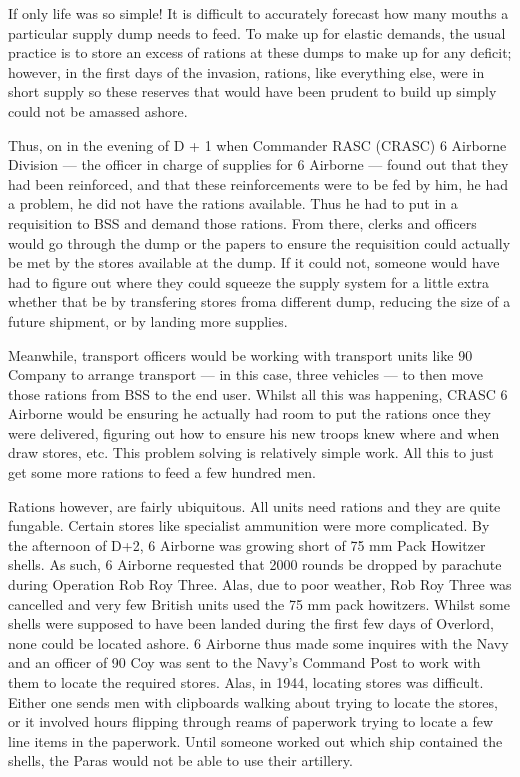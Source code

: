 \documentclass[noraggedright]{turabian-researchpaper}
\begin{document}
If only life was so simple!  It is difficult to accurately forecast how many
mouths a particular supply dump needs to feed. To make up for elastic demands,
the usual practice is to store an excess of 
rations at these dumps to make up for any deficit; however, in the first 
days of the invasion, rations, like everything else, were in short supply so 
these reserves that would have been prudent to build up simply could not be 
amassed ashore.  

Thus, on in the evening of D + 1 when Commander RASC (CRASC) 6 
Airborne Division --- the officer in charge of supplies for 6 Airborne --- 
found out that they had been reinforced, and that these reinforcements 
were to be fed by him, he had a problem, he did not have the rations 
available.\autocite[6]{90wdjun}  Thus he had to put in a requisition to
BSS and demand those rations.  From there, clerks and officers would go
through the dump or the papers to ensure the requisition could actually be 
met by the stores available at the dump.  If it could not, someone would have 
had to figure out where they could squeeze the supply system for a little 
extra whether that be by transfering stores froma  different dump, reducing
the size of a future shipment, or by landing more supplies.

Meanwhile, transport officers would be working with transport units like 90 
Company to arrange transport --- in this case, three vehicles --- to then 
move those rations from BSS to the end user.  Whilst all this was happening, 
CRASC 6 Airborne would be ensuring he actually had room to put the rations 
once they were delivered, figuring out how to ensure his new troops knew 
where and when draw stores, etc.  This problem solving is relatively simple 
work. All this to just get some more rations to feed a few hundred men.

Rations however, are fairly ubiquitous. All units need rations and they are
quite fungable.   Certain stores like specialist ammunition were more 
complicated.  By the afternoon of D+2, 6 Airborne was growing 
short of 75 mm Pack Howitzer shells.\autocite[7]{90wdjun} As such, 6 Airborne 
requested that 2000 rounds be dropped by parachute during Operation Rob Roy 
Three.\autocite [Appendix K to June 1944][1]{6aqwd} %
Alas, due to poor weather, Rob Roy Three was cancelled and 
very few British units used the 75 mm pack
howitzers. Whilst some shells were supposed to have been landed during the
first few days of Overlord, none could be located ashore.\autocite[Appendix K 
to June 1944][2]{6aqwd}  6 Airborne thus made some inquires with the Navy and 
an officer of 90 Coy was sent to the Navy's Command Post to work with them to 
locate the required stores.\autocite[7]{90wdjun}  Alas, in 1944, locating 
stores was difficult.  Either one sends men with clipboards walking about 
trying to locate the stores, or it involved hours flipping through reams of 
paperwork trying to locate a few line items in the paperwork.  Until someone 
worked out which ship contained the shells, the Paras would not be able to 
use their artillery. 
\end{document}
